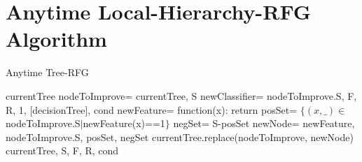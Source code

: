 \documentclass[letterpaper]{article}
\theoremstyle{definition}
\begin{document}
\begin{appendices}
\begin{algorithm}[H]
\begin{algorithmic}
\end{algorithmic}
\end{algorithm}

\section{Anytime Local-Hierarchy-RFG Algorithm} \label{app:3}
\begin{algorithm}[H]
\caption{Anytime Tree-RFG}
\label{code3}
\begin{algorithmic}
    \State
    \Return currentTree
\EndIf
\State nodeToImprove=  {currentTree, S}
\State newClassifier=  {nodeToImprove.S, F, R, 1, [decisionTree], cond}
\State newFeature= function(x): return 
\State posSet= $\{(x,\_)\in$ nodeToImprove.S$|$newFeature(x)==1$\}$
\State negSet= S-posSet
\State newNode=  {newFeature, nodeToImprove.S, posSet, negSet}
\State currentTree.replace(nodeToImprove, newNode)
\State
\Return {} {currentTree, S, F, R, cond}
\EndFunction

\end{algorithmic}
\end{algorithm}
\end{appendices}
\end{document}
